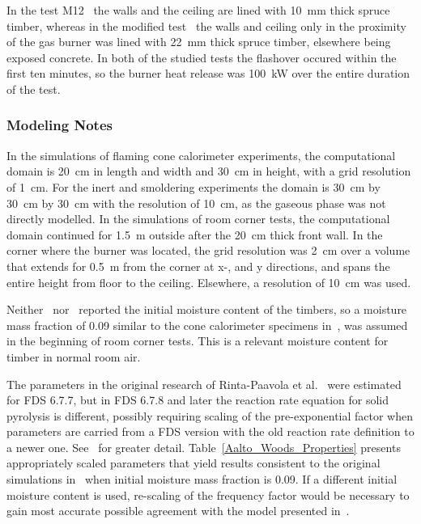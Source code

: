 In the test M12~\cite{Sundstrom:1998} the walls and the ceiling are lined with 10~mm thick spruce timber, whereas in the modified test~\cite{Hietaniemi:2001} the walls and ceiling only in the proximity of the gas burner was lined with 22~mm thick spruce timber, elsewhere being exposed concrete. In both of the studied tests the flashover occured within the first ten minutes, so the burner heat release was 100~kW over the entire duration of the test.

\subsubsection{Modeling Notes}

In the simulations of flaming cone calorimeter experiments, the computational domain is 20~cm in length and width and 30~cm in height, with a grid resolution of 1~cm. For the inert and smoldering experiments the domain is 30~cm by 30~cm by 30~cm with the resolution of 10~cm, as the gaseous phase was not directly modelled. In the simulations of room corner tests, the computational domain continued for 1.5~m outside after the 20~cm thick front wall. In the corner where the burner was located, the grid resolution was 2~cm over a volume that extends for 0.5~m from the corner at x-, and y directions, and spans the entire height from floor to the ceiling. Elsewhere, a resolution of 10~cm was used.

Neither~\cite{Sundstrom:1998} nor~\cite{Hietaniemi:2001} reported the initial moisture content of the timbers, so a moisture mass fraction of 0.09 similar to the cone calorimeter specimens in~\cite{Rinta-Paavola:2023}, was assumed in the beginning of room corner tests. This is a relevant moisture content for timber in normal room air.

The parameters in the original research of Rinta-Paavola et al.~\cite{Rinta-Paavola:2023} were estimated for FDS 6.7.7, but in FDS 6.7.8 and later the reaction rate equation for solid pyrolysis is different, possibly requiring scaling of the pre-exponential factor when parameters are carried from a FDS version with the old reaction rate definition to a newer one. See~\cite{Rinta-Paavola:2023} for greater detail. Table~\ref{Aalto_Woods_Properties} presents appropriately scaled parameters that yield results consistent to the original simulations in~\cite{Rinta-Paavola:2023} when initial moisture mass fraction is 0.09. If a different initial moisture content is used, re-scaling of the frequency factor would be necessary to gain most accurate possible agreement with the model presented in~\cite{Rinta-Paavola:2023}.


